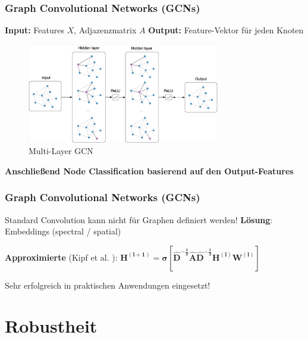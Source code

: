 \documentclass{beamer}
\begin{document}
\begin{frame}
  \frametitle{Graph Convolutional Networks (GCNs)}

  \textbf{Input:} Features $X$, Adjazenzmatrix $A$\newline
  \textbf{Output:} Feature-Vektor für jeden Knoten
  \begin{figure}
    \centering
    \includegraphics[width=0.75\textwidth]{img/GCN.png}
    \caption*{Multi-Layer GCN \cite{Kipf_2016}}
  \end{figure}
  \textbf{Anschließend Node Classification basierend auf den Output-Features}
\end{frame}

\begin{frame}
  \frametitle{Graph Convolutional Networks (GCNs)}

  Standard Convolution kann nicht für Graphen definiert werden!\newline
  \textbf{Lösung}: Embeddings (spectral / spatial)\newline

  \textbf{Approximierte } (Kipf et al. \cite{Kipf_2016}):\newline
  $\boldsymbol{H^{(l+1)} = \sigma [\hat{D}^{- \frac{1}{2}} \hat{A} \hat{D}^{- \frac{1}{2}} H^{(l)} W^{(l)}]}$\newline

  Sehr erfolgreich in praktischen Anwendungen eingesetzt!
\end{frame}

\section{Robustheit}
\end{document}
